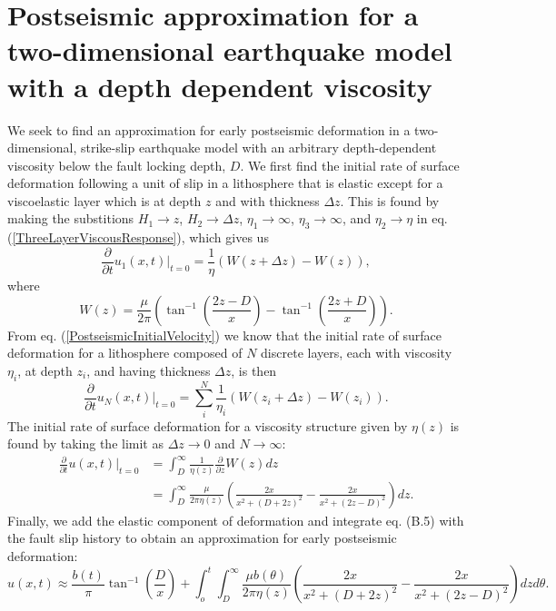 \documentclass[extra]{gji}
\begin{document}
\section{Postseismic approximation for a two-dimensional earthquake model with a depth dependent viscosity}
We seek to find an approximation for early postseismic deformation in
a two-dimensional, strike-slip earthquake model with an arbitrary
depth-dependent viscosity below the fault locking depth, $D$.  We
first find the initial rate of surface deformation following a unit of
slip in a lithosphere that is elastic except for a viscoelastic layer
which is at depth $z$ and with thickness $\Delta z$. This is found by
making the substitions $H_1 \to z$, $H_2 \to \Delta z$, $\eta_1 \to
\infty$, $\eta_3 \to \infty$, and $\eta_2 \to \eta$ in
eq. (\ref{ThreeLayerViscousResponse}), which gives us
\begin{equation}
  \frac{\partial}{\partial t}u_1(x,t)\big|_{t=0} = 
  \frac{1}{\eta}(W(z+\Delta z) - W(z)),
\end{equation}
where
\begin{equation}
  W(z) = \frac{\mu}{2\pi}\left(\tan^{-1}\left(\frac{2z-D}{x}\right) -
  \tan^{-1}\left(\frac{2z+D}{x}\right)\right).
\end{equation}
From eq. (\ref{PostseismicInitialVelocity}) we know that the initial
rate of surface deformation for a lithosphere composed of $N$ discrete
layers, each with viscosity $\eta_i$, at depth $z_i$, and having
thickness $\Delta z$, is then
\begin{equation}
  \frac{\partial}{\partial t}u_N(x,t)\big|_{t=0} = \sum_i^N
  \frac{1}{\eta_i}(W(z_i + \Delta z) - W(z_i)).
\end{equation}
The initial rate of surface deformation for a viscosity structure
given by $\eta(z)$ is found by taking the limit as $\Delta z \to 0$
and $N \to \infty$:
\begin{align}\label{ArbitraryViscousResponse}
 \frac{\partial}{\partial t}u(x,t)\big|_{t=0} &= \int_D^\infty
 \frac{1}{\eta(z)}\frac{\partial}{\partial z} W(z) dz\\
 &= \int_D^{\infty}\frac{\mu}{2\pi\eta(z)}\left(\frac{2x}{x^2 + \left(D + 2z\right)^2} -
                     \frac{2x}{x^2 + \left(2z - D\right)^2}\right) dz.
\end{align}
Finally, we add the elastic component of deformation and integrate
eq. (B.5) with the fault slip history to obtain
an approximation for early postseismic deformation:
\begin{equation}
u(x,t) \approx \frac{b(t)}{\pi}\tan^{-1}(\frac{D}{x}) + 
               \int_o^t\int_D^\infty \frac{\mu b(\theta)}{2\pi\eta(z)}
                                    \left(\frac{2x}{x^2 + \left(D + 2z\right)^2} - 
                                    \frac{2x}{x^2 + \left(2z - D\right)^2}\right)
                                    dz d\theta.
\end{equation}
\end{document}
